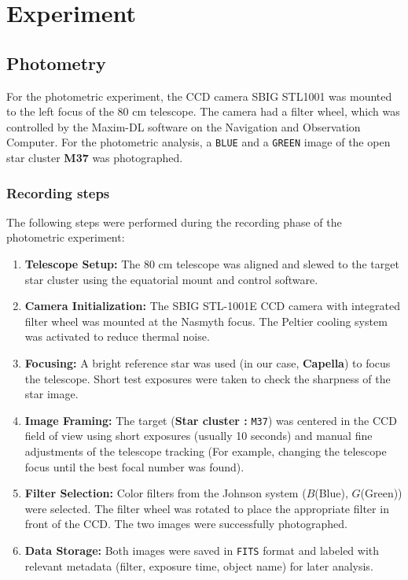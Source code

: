 \documentclass[12pt,a4paper]{article}
\begin{document}
\section{Experiment} 
\label{sec:experiment}
\subsection{Photometry}
For the photometric experiment, the CCD camera SBIG STL1001 was mounted to
the left focus of the 80 cm telescope. The camera had a filter wheel, which was controlled by the Maxim-DL software on the Navigation and Observation Computer.
For the photometric analysis, a \texttt{BLUE} and a \texttt{GREEN} image of the open star cluster \textbf{M37} was photographed.
\subsubsection{Recording steps}
The following steps were performed during the recording phase of the photometric experiment:

\begin{enumerate}
    \item \textbf{Telescope Setup:} The 80 cm telescope was aligned and slewed to the target star cluster using the equatorial mount and control software.
    
    \item \textbf{Camera Initialization:} The SBIG STL-1001E CCD camera with integrated filter wheel was mounted at the Nasmyth focus. The Peltier cooling system was activated to reduce thermal noise.
    
    \item \textbf{Focusing:} A bright reference star was used (in our case, \textbf{Capella}) to focus the telescope. Short test exposures were taken to check the sharpness of the star image.
    
    \item \textbf{Image Framing:} The target (\textbf{Star cluster :} \texttt{M37}) was centered in the CCD field of view using short exposures (usually 10 seconds) and manual fine adjustments of the telescope tracking (For example, changing the telescope focus until the best focal number was found).
    
    \item \textbf{Filter Selection:} Color filters from the Johnson system ($B$(Blue), $G$(Green)) were selected. The filter wheel was rotated to place the appropriate filter in front of the CCD. The two images were successfully photographed.
    
    \item \textbf{Data Storage:} Both images were saved in \texttt{FITS} format and labeled with relevant metadata (filter, exposure time, object name) for later analysis.
\end{enumerate}
\end{document}
